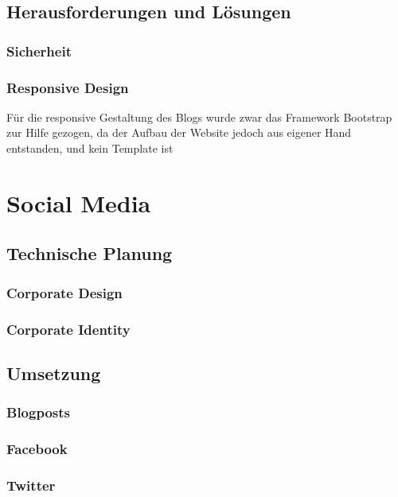 {  \subsection{Herausforderungen und Lösungen}

    \subsubsection{Sicherheit}

    \subsubsection{Responsive Design}
    Für die responsive Gestaltung des Blogs wurde zwar das Framework Bootstrap zur Hilfe gezogen, da der Aufbau der Website jedoch aus eigener Hand
    entstanden, und kein Template ist
\section{Social Media}

  \subsection{Technische Planung}

    \subsubsection{Corporate Design}

    \subsubsection{Corporate Identity}

  \subsection{Umsetzung}

    \subsubsection{Blogposts}

    \subsubsection{Facebook}

    \subsubsection{Twitter}

}
